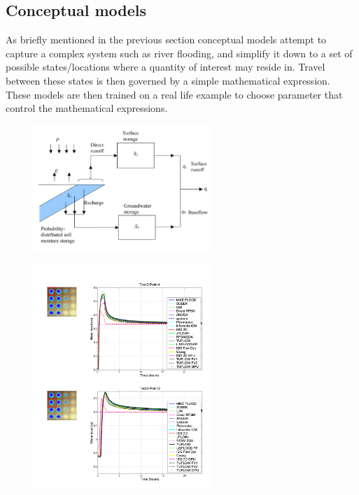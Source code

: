 \documentclass[11pt]{article}
\begin{document}
\subsection{Conceptual models}

 As briefly mentioned in the previous section conceptual models attempt to capture a complex system such as river flooding, and simplify it down to a set of possible states/locations where a quantity of interest may reside in. Travel between these states is then governed by a simple mathematical expression. These models are then trained on a real life example to choose parameter that control the mathematical expressions.
 
 \begin{minipage}{0.5\textwidth}
    \begin{figure}[H]
        \centering
        \includegraphics[width=0.6\textwidth]{Figs/Concept.png}
        \label{fig:conceptual}
    \end{figure}
    \begin{figure}[H]
        \centering
        \includegraphics[width=0.6\textwidth]{Figs/EA_bench.png}
        \label{fig:eaBench}
    \end{figure}
\end{minipage}
\end{document}
